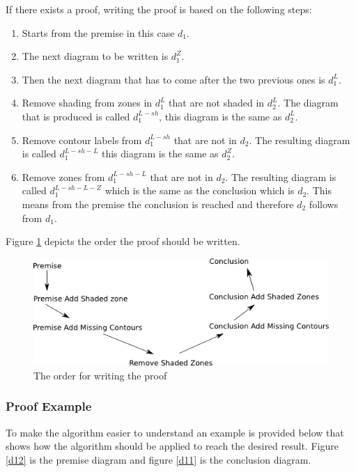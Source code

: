 \documentclass[10pt, a4paper, titlepage]{article}
\begin{document}
If there exists a proof, writing the proof is based on the following steps:

\begin{enumerate}
\item Starts from the premise in this case $d_{1}$.
\item The next diagram to be written is $ d^Z_{1} $.
\item Then the next diagram that has to come after the two previous ones is $ d^L_{1} $.
\item Remove shading from zones in $ d^L_{1} $ that are not shaded in $ d^L_{2} $. The diagram that is produced is called $ d^{L-sh}_{1} $, this diagram is the same as $ d^L_{2} $.
\item Remove contour labels from  $ d^{L-sh}_{1} $ that are not in  $ d_{2} $. The resulting diagram is called  $ d^{L-sh-L}_{1} $ this diagram is the same as $ d^Z_{2} $.
\item Remove zones from $ d^{L-sh-L}_{1} $ that are not in $ d_{2} $. The resulting diagram is called $ d^{L-sh-L-Z}_{1} $ which is the same as the conclusion which is $ d_{2} $. This means from the premise the conclusion is reached and therefore $d_{2}$ follows from $d_{1}$.
\end{enumerate}

Figure \ref{unitary} depicts the order the proof should be written.

\begin{figure}[h]
\centering
\includegraphics[scale=0.7]{images/unitary.png}
\caption{The order for writing the proof}
\label{unitary}
\end{figure}

\subsubsection{Proof Example}

To make the algorithm easier to understand an example is provided below that shows how the algorithm should be applied to reach the desired result. Figure \ref{d12} is the premise diagram and figure \ref{d11} is the conclusion diagram.
\end{document}
